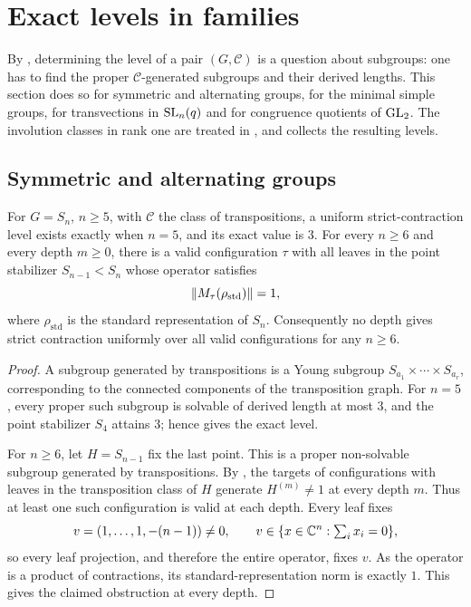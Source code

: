 \section{Exact levels in families}
\label{sec:synthesis}

By , determining the level of a pair
$(G,\mathcal C)$ is a question about subgroups: one has to find the
proper $\mathcal C$-generated subgroups and their derived lengths. This
section does so for symmetric and alternating groups, for the minimal
simple groups, for transvections in $\operatorname{SL}_n(q)$ and for congruence
quotients of $\operatorname{GL}_2$. The involution classes in rank one are treated in
, and  collects the resulting levels.

\subsection{Symmetric and alternating groups}

\begin{corollary}
\label{cor:Sn}
For $G=S_n$, $n\ge5$, with $\mathcal{C}$ the class of transpositions,
a uniform strict-contraction level exists exactly when $n=5$, and its exact
value is $3$.
For every $n\ge6$ and every depth $m\ge0$, there is a valid configuration $\tau$
with all leaves in the point stabilizer $S_{n-1}<S_n$ whose operator satisfies
\[
 \lVert M_\tau(\rho_{\mathrm{std}}) \rVert=1,
\]
where $\rho_{\mathrm{std}}$ is the standard representation of $S_n$.
Consequently no depth gives strict contraction uniformly over all valid
configurations for any $n\ge6$.
\end{corollary}
\begin{proof}
A subgroup generated by transpositions is a Young subgroup $S_{a_1}\times\cdots\times
S_{a_r}$, corresponding to the connected components of the transposition
graph. For $n=5$, every proper such subgroup is solvable of derived length
at most $3$, and the point stabilizer $S_4$ attains $3$; hence
 gives the exact level.

For $n\ge6$, let $H=S_{n-1}$ fix the last point. This is a proper
non-solvable subgroup generated by transpositions. By ,
the targets of configurations with leaves in the transposition class of
$H$ generate $H^{(m)}\ne1$ at every depth $m$. Thus at least one such
configuration is valid at each depth. Every leaf fixes
\[
 v=(1,\ldots,1,-(n-1))\ne0,
 \qquad v\in\{x\in\mathbb{C}^n:\textstyle\sum_i x_i=0\},
\]
so every leaf projection, and therefore the entire operator, fixes $v$.
As the operator is a product of contractions, its standard-representation
norm is exactly $1$. This gives the claimed obstruction at every depth.
\end{proof}

